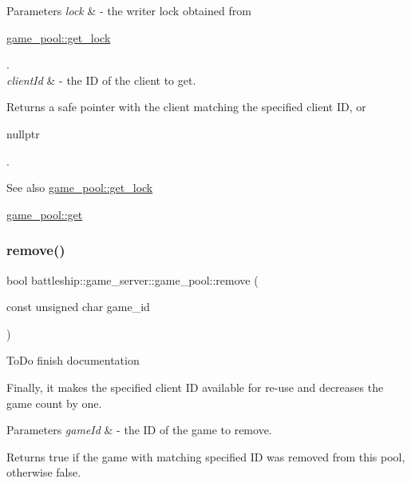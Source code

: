 \begin{DoxyParams}{Parameters}
{\em lock} & -\/ the writer lock obtained from
\begin{DoxyCode}
\hyperlink{classbattleship_1_1game__server_1_1game__pool_ae87384fc2dbf34f7f2769e8763c142b3}{game\_pool::get\_lock} 
\end{DoxyCode}
 . \\
\hline
{\em client\+Id} & -\/ the ID of the client to get.\\
\hline
\end{DoxyParams}
\begin{DoxyReturn}{Returns}
a safe pointer with the client matching the specified client ID, or 
\begin{DoxyCode}
\textcolor{keyword}{nullptr} 
\end{DoxyCode}
 .
\end{DoxyReturn}
\begin{DoxySeeAlso}{See also}
\hyperlink{classbattleship_1_1game__server_1_1game__pool_ae87384fc2dbf34f7f2769e8763c142b3}{game\+\_\+pool\+::get\+\_\+lock} 

\hyperlink{classbattleship_1_1game__server_1_1game__pool_ad6c1392c3842f1a37c762d1c27eba7d2}{game\+\_\+pool\+::get} 
\end{DoxySeeAlso}
\mbox{\label{classbattleship_1_1game__server_1_1game__pool_a49cca84e56ae8a98559a6345d147511d}} 
\subsubsection{\texorpdfstring{remove()}{remove()}}
{\footnotesize\ttfamily bool battleship\+::game\+\_\+server\+::game\+\_\+pool\+::remove (\begin{DoxyParamCaption}\item[{const unsigned char}]{game\+\_\+id }\end{DoxyParamCaption})}

To\+Do finish documentation

Finally, it makes the specified client ID available for re-\/use and decreases the game count by one.


\begin{DoxyParams}{Parameters}
{\em game\+Id} & -\/ the ID of the game to remove. \\
\hline
\end{DoxyParams}
\begin{DoxyReturn}{Returns}
true if the game with matching specified ID was removed from this pool, otherwise false. 
\end{DoxyReturn}
\mbox{\label{classbattleship_1_1game__server_1_1game__pool_ae35839994dec4bd94fb1dc7134c1e1ff}} 
